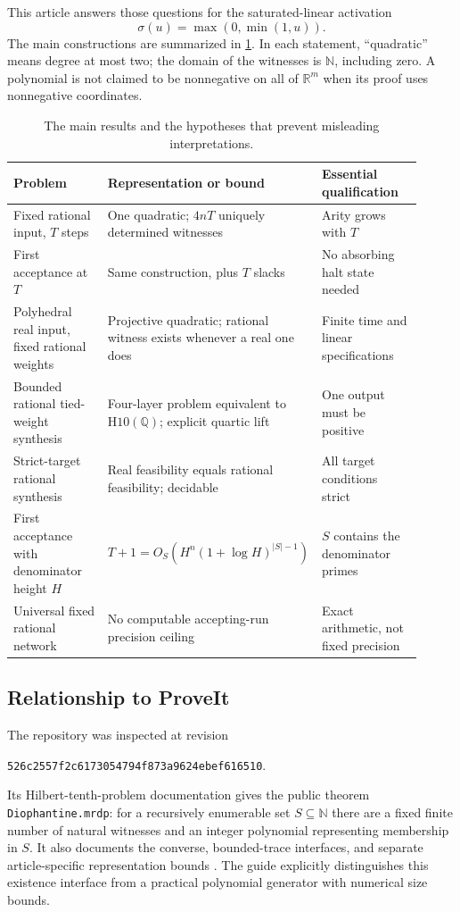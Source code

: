 \documentclass[11pt,letterpaper]{article}
\numberwithin{equation}{section}
\theoremstyle{definition}
\theoremstyle{remark}
\newcommand{\N}{\mathbb N}
\newcommand{\Q}{\mathbb Q}
\newcommand{\R}{\mathbb R}
\newcommand{\Hten}{\mathrm{H10}(\Q)}
\begin{document}
This article answers those questions for the saturated-linear activation
\begin{equation}\label{pqc:pm:eq:sigma}
 \sigma(u)=\max(0,\min(1,u)).
\end{equation}
The main constructions are summarized in \cref{pqc:pm:tab:results}. In each statement,
``quadratic'' means degree at most two; the domain of the witnesses is $\N$,
including zero. A polynomial is not claimed to be nonnegative on all of $\R^m$
when its proof uses nonnegative coordinates.

\begin{table}[ht]
\centering\small
\begin{tabular}{p{0.27\linewidth}p{0.35\linewidth}p{0.29\linewidth}}
\toprule
Problem & Representation or bound & Essential qualification\\
\midrule
Fixed rational input, $T$ steps & One quadratic; $4nT$ uniquely determined witnesses & Arity grows with $T$\\
First acceptance at $T$ & Same construction, plus $T$ slacks & No absorbing halt state needed\\
Polyhedral real input, fixed rational weights & Projective quadratic; rational witness exists whenever a real one does & Finite time and linear specifications\\
Bounded rational tied-weight synthesis & Four-layer problem equivalent to $\Hten$; explicit quartic lift & One output must be positive\\
Strict-target rational synthesis & Real feasibility equals rational feasibility; decidable & All target conditions strict\\
First acceptance with denominator height $H$ & $T+1=O_S(H^n(1+\log H)^{|S|-1})$ & $S$ contains the denominator primes\\
Universal fixed rational network & No computable accepting-run precision ceiling & Exact arithmetic, not fixed precision\\
\bottomrule
\end{tabular}
\caption{The main results and the hypotheses that prevent misleading interpretations.}
\label{pqc:pm:tab:results}
\end{table}

\subsection{Relationship to ProveIt}

The repository was inspected at revision
\begin{center}
\texttt{526c2557f2c6173054794f873a9624ebef616510}.
\end{center}
Its Hilbert-tenth-problem documentation gives the public theorem
\texttt{Diophantine.mrdp}: for a recursively enumerable set $S\subseteq\N$ there
are a fixed finite number of natural witnesses and an integer polynomial
representing membership in $S$. It also documents the converse, bounded-trace
interfaces, and separate article-specific representation bounds
\cite{b62s15-proveit,b62s15-proveit-mrdp}. The guide explicitly distinguishes this existence
interface from a practical polynomial generator with numerical size bounds.
\end{document}
